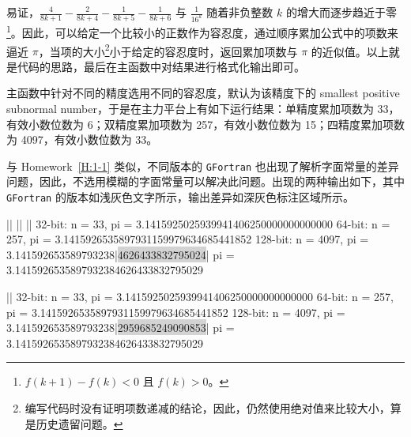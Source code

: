 易证，$\tfrac{4}{8k+1} - \tfrac{2}{8k+4} - \tfrac{1}{8k+5} - \tfrac{1}{8k+6}$ 与 $\tfrac{1}{16^k}$ 随着非负整数 $k$ 的增大而逐步趋近于零\footnote{$f(k+1)-f(k)<0$ 且 $f(k)>0$。}。因此，可以给定一个比较小的正数作为容忍度，通过顺序累加公式中的项数来逼近 $\pi$，当项的大小\footnote{编写代码时没有证明项数递减的结论，因此，仍然使用绝对值来比较大小，算是历史遗留问题。}小于给定的容忍度时，返回累加项数与 $\pi$ 的近似值。以上就是代码的思路，最后在主函数中对结果进行格式化输出即可。

主函数中针对不同的精度选用不同的容忍度，默认为该精度下的 smallest positive subnormal number，于是在主力平台上有如下运行结果：单精度累加项数为 33，有效小数位数为 6；双精度累加项数为 257，有效小数位数为 15；四精度累加项数为 4097，有效小数位数为 33。

与 Homework~\ref{H:1-1} 类似，不同版本的 \texttt{GFortran} 也出现了解析字面常量的差异问题，因此，不选用模糊的字面常量可以解决此问题。出现的两种输出如下，其中 \texttt{GFortran} 的版本如浅灰色文字所示，输出差异如深灰色标注区域所示。

\begin{plaintext}[minted options={numbers=left, gobble=0, escapeinside=||, python3}]
||
||
||
 32-bit: n =   33, pi = 3.1415925025939941406250000000000000
 64-bit: n =  257, pi = 3.1415926535897931159979634685441852
128-bit: n = 4097, pi = 3.141592653589793238|\colorbox{lightgray}{4626433832795024}|
                   pi = 3.1415926535897932384626433832795029
\end{plaintext}

\begin{plaintext}[minted options={numbers=left, gobble=0, escapeinside=||, python3}]
||
 32-bit: n =   33, pi = 3.1415925025939941406250000000000000
 64-bit: n =  257, pi = 3.1415926535897931159979634685441852
128-bit: n = 4097, pi = 3.141592653589793238|\colorbox{lightgray}{2959685249090853}|
                   pi = 3.1415926535897932384626433832795029
\end{plaintext}
